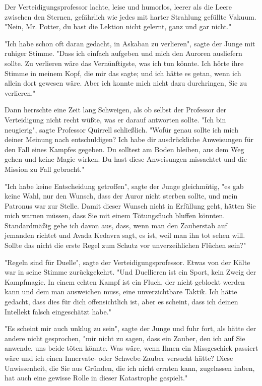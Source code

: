 {Der Verteidigungsprofessor lachte, leise und humorlos, leerer als die Leere zwischen den Sternen, gefährlich wie jedes mit harter Strahlung gefüllte Vakuum. "Nein, Mr. Potter, du hast die Lektion nicht gelernt, ganz und gar nicht."

"Ich habe schon oft daran gedacht, in Askaban zu verlieren", sagte der Junge mit ruhiger Stimme. "Dass ich einfach aufgeben und mich den Auroren ausliefern sollte. Zu verlieren wäre das Vernünftigste, was ich tun könnte. Ich hörte ihre Stimme in meinem Kopf, die mir das sagte; und ich hätte es getan, wenn ich allein dort gewesen wäre. Aber ich konnte mich nicht dazu durchringen, Sie zu verlieren."

Dann herrschte eine Zeit lang Schweigen, als ob selbst der Professor der Verteidigung nicht recht wüßte, was er darauf antworten sollte. "Ich bin neugierig", sagte Professor Quirrell schließlich. "Wofür genau sollte ich mich deiner Meinung nach entschuldigen? Ich habe dir ausdrückliche Anweisungen für den Fall eines Kampfes gegeben. Du solltest am Boden bleiben, aus dem Weg gehen und keine Magie wirken. Du hast diese Anweisungen missachtet und die Mission zu Fall gebracht."

"Ich habe keine Entscheidung getroffen", sagte der Junge gleichmütig, "es gab keine Wahl, nur den Wunsch, dass der Auror nicht sterben sollte, und mein Patronus war zur Stelle. Damit dieser Wunsch nicht in Erfüllung geht, hätten Sie mich warnen müssen, dass Sie mit einem Tötungsfluch bluffen könnten. Standardmäßig gehe ich davon aus, dass, wenn man den Zauberstab auf jemanden richtet und Avada Kedavra sagt, es ist, weil man ihn tot sehen will. Sollte das nicht die erste Regel zum Schutz vor unverzeihlichen Flüchen sein?"

"Regeln sind für Duelle", sagte der Verteidigungsprofessor. Etwas von der Kälte war in seine Stimme zurückgekehrt. "Und Duellieren ist ein Sport, kein Zweig der Kampfmagie. In einem echten Kampf ist ein Fluch, der nicht geblockt werden kann und dem man ausweichen muss, eine unverzichtbare Taktik. Ich hätte gedacht, dass dies für dich offensichtlich ist, aber es scheint, dass ich deinen Intellekt falsch eingeschätzt habe."

"Es scheint mir auch unklug zu sein", sagte der Junge und fuhr fort, als hätte der andere nicht gesprochen, "mir nicht zu sagen, dass ein Zauber, den ich auf Sie anwende, uns beide töten könnte. Was wäre, wenn Ihnen ein Missgeschick passiert wäre und ich einen Innervate- oder Schwebe-Zauber versucht hätte? Diese Unwissenheit, die Sie aus Gründen, die ich nicht erraten kann, zugelassen haben, hat auch eine gewisse Rolle in dieser Katastrophe gespielt."

}

